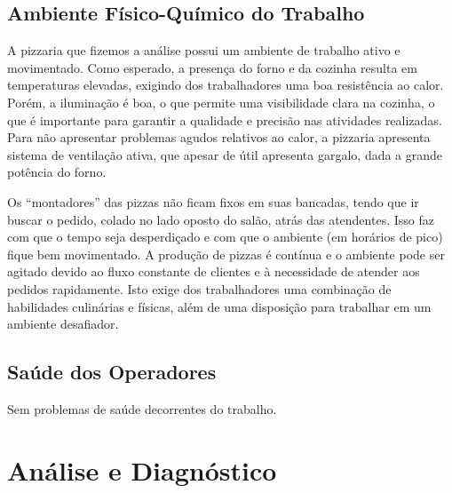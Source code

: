 \documentclass[11pt]{article}
\begin{document}
\subsection{Ambiente Físico-Químico do Trabalho}

A pizzaria que fizemos a análise possui um ambiente de trabalho ativo e movimentado. Como esperado, a presença do forno e da cozinha resulta em temperaturas elevadas, exigindo dos trabalhadores uma boa resistência ao calor. Porém, a iluminação é boa, o que permite uma visibilidade clara na cozinha, o que é importante para garantir a qualidade e precisão nas atividades realizadas. Para não apresentar problemas agudos relativos ao calor, a pizzaria apresenta sistema de ventilação ativa, que apesar de útil apresenta gargalo, dada a grande potência do forno. 

Os “montadores” das pizzas não ficam fixos em suas bancadas, tendo que ir buscar o pedido, colado no lado oposto do salão, atrás das atendentes. Isso faz com que o tempo seja desperdiçado e com que o ambiente (em horários de pico) fique bem movimentado. A produção de pizzas é contínua e o ambiente pode ser agitado devido ao fluxo constante de clientes e à necessidade de atender aos pedidos rapidamente. Isto exige dos trabalhadores uma combinação de habilidades culinárias e físicas, além de uma disposição para trabalhar em um ambiente desafiador.


\subsection{Saúde dos Operadores}

Sem problemas de saúde decorrentes do trabalho.



\section{Análise e Diagnóstico}
\end{document}
